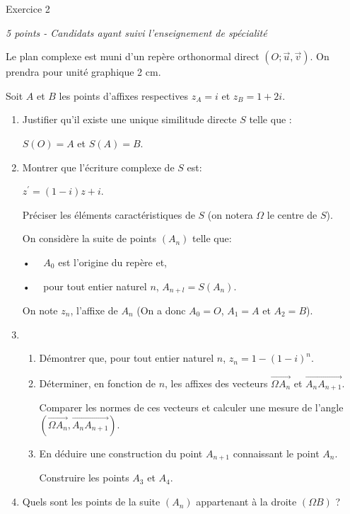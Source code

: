 
%
\begin{h2}Exercice 2\end{h2}
\textit{ 5 points - Candidats ayant suivi l'enseignement de spécialité}
\par
Le plan complexe est muni d'un repère orthonormal direct $\left(O; \vec{u}, \vec{v}\right)$. On prendra pour unité graphique 2 cm.
\par
Soit $A$ et $B$ les points d'affixes respectives $z_{A}=i$ et $z_{B}=1+2i$.
\begin{enumerate}
     \item
     Justifier qu'il existe une unique similitude directe $S$ telle que :
     \par
     $S\left(O\right)=A$ et $S\left(A\right)=B$.
     \item
     Montrer que l'écriture complexe de $S$ est:
     \par
     $z^{\prime}=\left(1-i\right)z+i$.
     \par
     Préciser les éléments caractéristiques de $S$ (on notera $\Omega $ le centre de $S$).
     \par
     On considère la suite de points $\left(A_{n}\right)$ telle que:
     \par
     •~~ $A_{0}$ est l'origine du repère et,
     \par
     •~~ pour tout entier naturel $n$, $A_{n+l}= S\left(A_{n}\right)$.
     \par
     On note $z_{n}$, l'affixe de $A_{n}$ (On a donc $A_{0}=O$, $A_{1}=A$ et $A_{2}=B$).
     \item
     \begin{enumerate}[label=\alph*.]
          \item
          Démontrer que, pour tout entier naturel $n$, $z_{n}=1-\left(1-i\right)^{n}$.
          \item
          Déterminer, en fonction de $n$, les affixes des vecteurs $\overrightarrow{\Omega  A_{n}}$ et $\overrightarrow{A_{n}A_{n+1}}$.
          \par
          Comparer les normes de ces vecteurs et calculer une mesure de l'angle $\left(\overrightarrow{\Omega  A_{n}},\overrightarrow{A_{n}A_{n+1}}\right)$.
          \item
          En déduire une construction du point $A_{n+1}$ connaissant le point $A_{n}$.
          \par
          Construire les points $A_{3}$ et $A_{4}$.
     \end{enumerate}
     \item
     Quels sont les points de la suite $\left(A_{n}\right)$ appartenant à la droite $\left(\Omega  B\right)$ ?
\end{enumerate}
